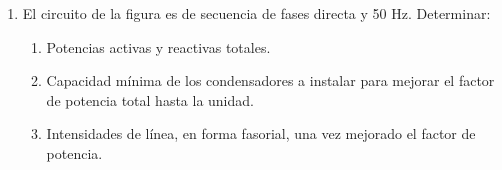 \begin{enumerate}
  \emph{Sol.:\;
    $P_1 = \SI{30}{\kilo\watt};\; 
    Q_1 = \qty{24.06}{\kilo\voltampere_r};\; 
    S_1 = \SI{38.46}{\kilo\voltampere};\;
    P_2 = \SI{7.5}{\kilo\watt};\; 
    Q_2 = \qty{8.31}{\kilo\voltampere_r};\; 
    S_2 = \SI{11.19}{\kilo\voltampere}; \;
    P_T = \SI{37.5}{\kilo\watt};\; 
    Q_T = \qty{32.37}{\kilo\voltampere_r};\; S_T = \SI{49.54}{\kilo\voltampere};\; 
    I_1 = \qty{55.51}{\ampere};\; 
    I_2 = \qty{16.15}{\ampere};\; 
    I_T= \qty{71.5}{\ampere};\; 
    W_{A,AC} = \SI{28.09}{\kilo\watt};\;
    W_{B,BC} = \SI{9.41}{\kilo\watt};\;
    W_{C, BA} = \SI{-18.66}{\kilo\watt};\;
    P_g = \SI{39.73}{\kilo\watt};\; 
    Q_g = \qty{32.33}{\kilo\voltampere_r};\; 
    S_g = \SI{51.22}{\kilo\voltampere};\; 
    U_g = \qty{413.64}{\volt};\; 
    C_{\triangle} = \qty{214.4}{\micro\farad}/\mathrm{fase};\;
    I_T' = \qty{54.13}{\ampere};\; 
    P_g' = \SI{38.78}{\kilo\watt};\; 
    Q_g' = \qty{0}{\voltampere_r};\; 
    S_g' = \SI{38.78}{\kilo\voltampere};\; 
    U'_g = \qty{413.63}{\volt};\;
    W_{A,AC}' = \SI{18.75}{\kilo\watt};\;
    W_{B,BC}' = \SI{18.75}{\kilo\watt};\; 
    W'_{C,BA} = \SI{0}{\kilo\watt}$ }

 
\item El circuito de la figura es de secuencia de fases directa y 50
  Hz. Determinar:
  \begin{enumerate}
  \item Potencias activas y reactivas totales.
  \item Capacidad mínima de los condensadores a instalar para mejorar
    el factor de potencia total hasta la unidad.
  \item Intensidades de línea, en forma fasorial, una vez mejorado el
    factor de potencia.
  \end{enumerate}
  \begin{minipage}{0.4\linewidth}


\end{minipage}
\end{enumerate}
